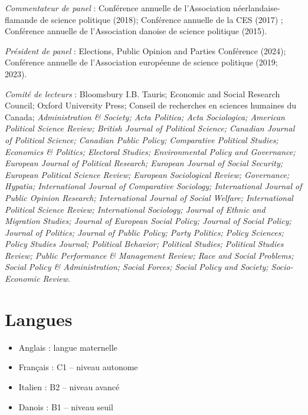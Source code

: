 \documentclass[letterpaper,fontsize=10.5pt]{scrartcl}
\begin{document}
{}\textit{Commentateur de panel} : Conférence annuelle de l'Association néerlandaise-flamande de science politique (2018); Conférence annuelle de la CES (2017) ; Conférence annuelle de l'Association danoise de science politique (2015).\\
\hfill \break
{}
{}\textit{Président de panel} : Elections, Public Opinion and Parties Conférence (2024); Conférence annuelle de l'Association européenne de science politique (2019; 2023).\\
\hfill \break
{}
{}\textit{Comité de lecteurs} : Bloomsbury I.B. Tauris; Economic and Social Research Council; Oxford University Press; Conseil de recherches en sciences humaines du Canada; \textit{Administration \& Society; Acta Politica; Acta Sociologica; American Political Science Review; British Journal of Political Science; Canadian Journal of Political Science; Canadian Public Policy; Comparative Political Studies; Economics \& Politics; Electoral Studies; Environmental Policy and Governance; European Journal of Political Research; European Journal of Social Security; European Political Science Review; European Sociological Review; Governance; Hypatia; International Journal of Comparative Sociology; International Journal of Public Opinion Research; International Journal of Social Welfare; International Political Science Review; International Sociology; Journal of Ethnic and Migration Studies; Journal of European Social Policy; Journal of Social Policy; Journal of Politics; Journal of Public Policy; Party Politics; Policy Sciences; Policy Studies Journal; Political Behavior; Political Studies; Political Studies Review; Public Performance \& Management Review; Race and Social Problems; Social Policy \& Administration; Social Forces; Social Policy and Society; Socio-Economic Review}.

\section{Langues}
\begin{itemize}[itemsep=0em, topsep=0em, partopsep=0em]
	\item Anglais : langue maternelle
	\item Français : C1 -- niveau autonome
	\item Italien : B2 -- niveau avancé
	\item Danois : B1 -- niveau seuil \\
\end{itemize}
\end{document}
